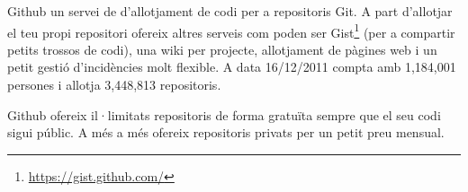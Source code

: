 Github un servei de d'allotjament de codi per a repositoris Git. A part d'allotjar el teu propi repositori ofereix altres serveis com poden ser Gist\footnote{\url{https://gist.github.com/}} (per a compartir petits trossos de codi), una wiki per projecte, allotjament de pàgines web i un petit gestió d'incidències molt flexible. A data 16/12/2011 compta amb 1,184,001 persones i allotja 3,448,813 repositoris.

Github ofereix il·limitats repositoris de forma gratuïta sempre que el seu codi sigui públic. A més a més ofereix repositoris privats per un petit preu mensual. 


